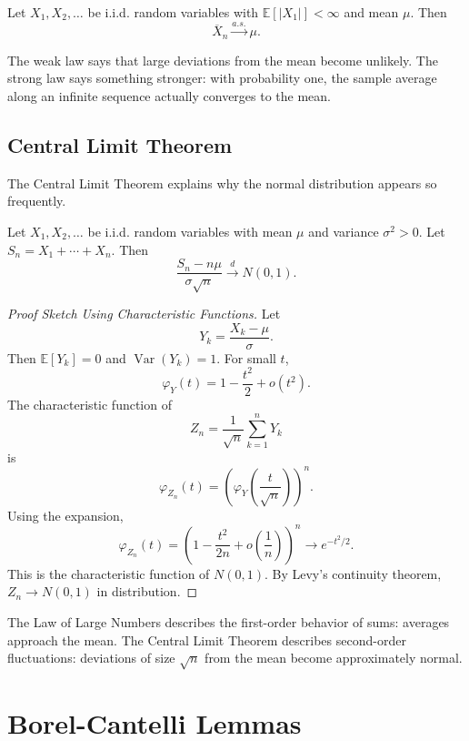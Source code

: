 \begin{theorem}
Let $X_1,X_2,\dots$ be i.i.d. random variables with $\mathbb{E}[|X_1|]<\infty$ and mean $\mu$. Then
\[
    \overline{X}_n\xrightarrow{a.s.}\mu.
\]
\end{theorem}

\begin{remark}
The weak law says that large deviations from the mean become unlikely. The strong law says something stronger: with probability one, the sample average along an infinite sequence actually converges to the mean.
\end{remark}

\subsection{Central Limit Theorem}

The Central Limit Theorem explains why the normal distribution appears so frequently.

\begin{theorem}
Let $X_1,X_2,\dots$ be i.i.d. random variables with mean $\mu$ and variance $\sigma^2>0$. Let $S_n=X_1+\cdots+X_n$. Then
\[
    \frac{S_n-n\mu}{\sigma\sqrt{n}}\xrightarrow{d}N(0,1).
\]
\end{theorem}

\begin{proof}[Proof Sketch Using Characteristic Functions]
Let
\[
    Y_k=\frac{X_k-\mu}{\sigma}.
\]
Then $\mathbb{E}[Y_k]=0$ and $\operatorname{Var}(Y_k)=1$. For small $t$,
\[
    \varphi_Y(t)=1-\frac{t^2}{2}+o(t^2).
\]
The characteristic function of
\[
    Z_n=\frac{1}{\sqrt{n}}\sum_{k=1}^{n}Y_k
\]
is
\[
    \varphi_{Z_n}(t)=\left(\varphi_Y\left(\frac{t}{\sqrt{n}}\right)\right)^n.
\]
Using the expansion,
\[
    \varphi_{Z_n}(t)=\left(1-\frac{t^2}{2n}+o\left(\frac{1}{n}\right)\right)^n\to e^{-t^2/2}.
\]
This is the characteristic function of $N(0,1)$. By Levy's continuity theorem, $Z_n\to N(0,1)$ in distribution.
\end{proof}

\begin{remark}
The Law of Large Numbers describes the first-order behavior of sums: averages approach the mean. The Central Limit Theorem describes second-order fluctuations: deviations of size $\sqrt{n}$ from the mean become approximately normal.
\end{remark}

\section{Borel-Cantelli Lemmas}



